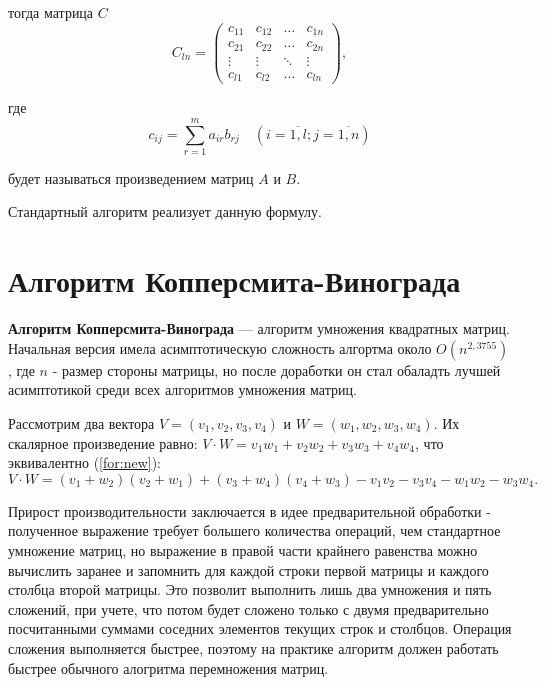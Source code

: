 тогда матрица $C$
\begin{equation}
	C_{ln} = \begin{pmatrix}
		c_{11} & c_{12} & \ldots & c_{1n}\\
		c_{21} & c_{22} & \ldots & c_{2n}\\
		\vdots & \vdots & \ddots & \vdots\\
		c_{l1} & c_{l2} & \ldots & c_{ln}
	\end{pmatrix},
\end{equation}

где
\begin{equation}
	\label{eq:M}
	c_{ij} =
	\sum_{r=1}^{m} a_{ir}b_{rj} \quad (i=\overline{1,l}; j=\overline{1,n})
\end{equation}

будет называться произведением матриц $A$ и $B$.

Стандартный алгоритм реализует данную формулу.


\section{Алгоритм Копперсмита-Винограда}

\textbf{Алгоритм Копперсмита-Винограда} \cite{vinograd-matrix} — алгоритм умножения квадратных матриц. Начальная версия имела асимптотическую сложность алгортма около $O(n^{2,3755})$, где $n$ - размер стороны матрицы, но после доработки он стал обаладть лучшей асимптотикой среди всех алгоритмов умножения матриц.

Рассмотрим два вектора $V = (v_1, v_2, v_3, v_4)$ и $W = (w_1, w_2, w_3, w_4)$.
Их скалярное произведение равно: $V \cdot W = v_1w_1 + v_2w_2 + v_3w_3 + v_4w_4$, что эквивалентно (\ref{for:new}):
\begin{equation}
	\label{for:new}
	V \cdot W = (v_1 + w_2)(v_2 + w_1) + (v_3 + w_4)(v_4 + w_3) - v_1v_2 - v_3v_4 - w_1w_2 - w_3w_4.
\end{equation}

Прирост производительности заключается в идее предварительной обработки - полученное выражение требует большего количества операций, чем стандартное умножение матриц, но выражение в правой части крайнего равенства можно вычислить заранее и запомнить для каждой строки первой матрицы и каждого столбца второй матрицы. 
Это позволит выполнить лишь два умножения и пять сложений, при учете, что потом будет сложено только с двумя предварительно посчитанными суммами соседних элементов текущих строк и столбцов. Операция сложения выполняется быстрее, поэтому на практике алгоритм должен работать быстрее обычного алогритма перемножения матриц.

